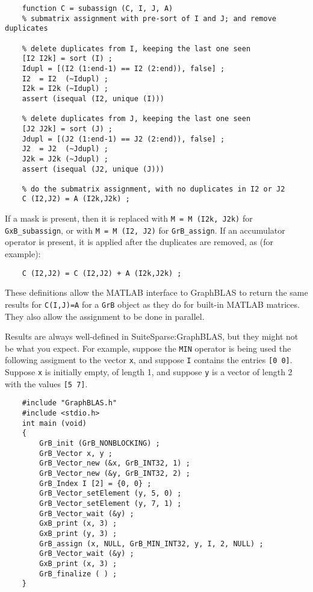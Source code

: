 \documentclass[12pt]{article}
\begin{document}
{\small
\begin{verbatim}
    function C = subassign (C, I, J, A)
    % submatrix assignment with pre-sort of I and J; and remove duplicates

    % delete duplicates from I, keeping the last one seen
    [I2 I2k] = sort (I) ;
    Idupl = [(I2 (1:end-1) == I2 (2:end)), false] ;
    I2  = I2  (~Idupl) ;
    I2k = I2k (~Idupl) ;
    assert (isequal (I2, unique (I)))

    % delete duplicates from J, keeping the last one seen
    [J2 J2k] = sort (J) ;
    Jdupl = [(J2 (1:end-1) == J2 (2:end)), false] ;
    J2  = J2  (~Jdupl) ;
    J2k = J2k (~Jdupl) ;
    assert (isequal (J2, unique (J)))

    % do the submatrix assignment, with no duplicates in I2 or J2
    C (I2,J2) = A (I2k,J2k) ;
\end{verbatim}}

If a mask is present, then it is replaced with \verb'M = M (I2k, J2k)' for
\verb'GxB_subassign', or with \verb'M = M (I2, J2)' for \verb'GrB_assign'.
If an accumulator operator is present, it is applied after the duplicates
are removed, as (for example):

{\small
\begin{verbatim}
    C (I2,J2) = C (I2,J2) + A (I2k,J2k) ;
\end{verbatim}}

These definitions allow the MATLAB interface to GraphBLAS to return the same
results for \verb'C(I,J)=A' for a \verb'GrB' object as they do for built-in
MATLAB matrices.  They also allow the assignment to be done in parallel.

Results are always well-defined in SuiteSparse:GraphBLAS, but they might not be
what you expect.  For example, suppose the \verb'MIN' operator is being used
the following assigment to the vector \verb'x', and suppose \verb'I' contains
the entries \verb'[0 0]'.  Suppose \verb'x' is initially empty, of length 1,
and suppose \verb'y' is a vector of length 2 with the values \verb'[5 7]'.

{\small
\begin{verbatim}
    #include "GraphBLAS.h"
    #include <stdio.h>
    int main (void)
    {
        GrB_init (GrB_NONBLOCKING) ;
        GrB_Vector x, y ;
        GrB_Vector_new (&x, GrB_INT32, 1) ;
        GrB_Vector_new (&y, GrB_INT32, 2) ;
        GrB_Index I [2] = {0, 0} ;
        GrB_Vector_setElement (y, 5, 0) ;
        GrB_Vector_setElement (y, 7, 1) ;
        GrB_Vector_wait (&y) ;
        GxB_print (x, 3) ;
        GxB_print (y, 3) ;
        GrB_assign (x, NULL, GrB_MIN_INT32, y, I, 2, NULL) ;
        GrB_Vector_wait (&y) ;
        GxB_print (x, 3) ;
        GrB_finalize ( ) ;
    }
\end{verbatim}}
\end{document}
